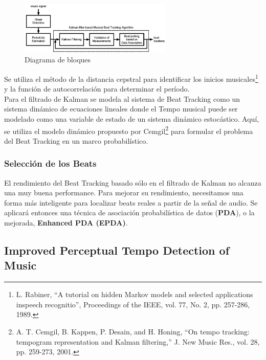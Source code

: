 \documentclass[12pt,a4paper,titlepage]{report}
\begin{document}
\begin{figure}[h!]
	\vspace{-20pt}
	\begin{center}
	\includegraphics[width=0.65\textwidth]{./pics/kalman_blocks.jpg}
	\end{center}
	\caption{Diagrama de bloques}
	\label{fig:kalman_blocks}
\end{figure}

Se utiliza el método de la distancia cepstral para identificar los inicios musicales\footnote{L. Rabiner, ``A tutorial on hidden Markov models and selected applications
inspeech recognitio'', Proceedings of the IEEE, vol. 77, No. 2, pp. 257-286, 1989.} y la función de autocorrelación para determinar el período.\\

Para el filtrado de Kalman se modela al sistema de Beat Tracking como un sistema dinámico de ecuaciones lineales donde el Tempo musical puede ser modelado como una variable de estado de un sistema dinámico estocástico. Aquí, se utiliza el modelo dinámico propuesto por Cemgil\footnote{ A. T. Cemgil, B. Kappen, P. Desain, and H. Honing, ``On tempo
tracking: tempogram representation and Kalman filtering,'' J. New Music
Res., vol. 28, pp. 259-273, 2001.} para formular el problema del Beat Tracking  en un marco probabilístico.

\subsubsection*{Selección de los Beats}
El rendimiento del Beat Tracking basado sólo en el filtrado de Kalman no alcanza una muy buena performance. Para mejorar su rendimiento, necesitamos una forma más inteligente para localizar beats reales a partir de la señal de audio. Se aplicará entonces una técnica de asociación probabilística de datos (\textbf{PDA}), o la mejorada, \textbf{Enhanced PDA (EPDA)}.

\subsection*{Improved Perceptual Tempo Detection of Music}
\end{document}
